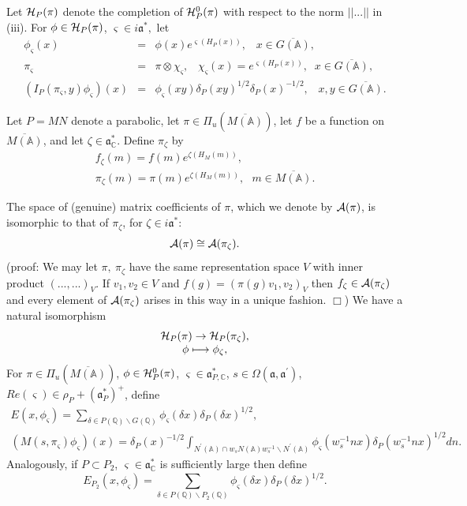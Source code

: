 Let ${\cal H}_P(\pi )$ denote the completion of ${\cal H}_P^0(\pi )$ with
respect to the norm $||...||$ in (iii). For
$\phi \in {\cal H}_P(\pi )$, $\varsigma \in i{\mathfrak{a}}^{*},$ let
\begin{eqnarray*}
\phi _\varsigma (x)
&=&\phi (x)e^{\varsigma (H_P(x))},\;\;\;x\in \overline{G({\mathbb{A}})},
\\
\pi _\varsigma  &=&\pi \otimes \chi _\varsigma ,\;\;\;\chi _\varsigma
(x)=e^{\varsigma (H_P(x))},\;\;x\in \overline{G({\mathbb{A}})}, \\
(I_P(\pi _\varsigma ,y)\phi _\varsigma )(x) &=&\phi _\varsigma (xy)\delta
_P(xy)^{1/2}\delta _P(x)^{-1/2},\;\;\;x,y\in \overline{G({\mathbb{A}})}.
\end{eqnarray*}

Let $P=MN$ denote a parabolic, let $\pi \in \Pi _u(\overline{M({\mathbb{A}})})$,
let $f$ be a function on $\overline{M({\mathbb{A}})}$,
and let $\zeta\in {\mathfrak{a}}^*_{\mathbb{C}}$. Define $\pi_\zeta$ by
\begin{equation}
\begin{array}{c}
f_\zeta (m)=f(m)e^{\zeta(H_M(m))},\\
\pi_\zeta(m)=\pi(m)e^{\zeta(H_M(m))},\ \ \ m\in \overline{M({\mathbb{A}})}.
\end{array}
\end{equation}

The space of (genuine) matrix coefficients of $\pi$, which we denote by
${\cal A}(\pi)$, is isomorphic to that of $\pi_\zeta$, for
$\zeta\in i{\mathfrak{a}}^*$:
$$
{\cal A}(\pi)\cong {\cal A}(\pi_\zeta).
$$
(proof: We may let $\pi,\ \pi_\zeta$ have the same representation space
$V$ with inner product $(...,...)_V$. If $v_1,v_2\in V$ and
$f(g)=(\pi(g)v_1,v_2)_V$ then $f_\zeta\in {\cal A}(\pi_\zeta)$ and every
element of ${\cal A}(\pi_\zeta)$ arises in this way in a unique
fashion. $\Box$) We have a natural isomorphism
$$
\begin{array}{c}
{\cal H}_P(\pi)\rightarrow {\cal H}_P(\pi_\zeta),\\
\phi\longmapsto \phi_\zeta,
\end{array}
$$
For $\pi \in \Pi _u(\overline{M({\mathbb{A}})})$,
$\phi \in {\cal H}_P^0(\pi )$,
$\varsigma \in {\mathfrak{a}}_{P,{\mathbb C}}^{*}$,
$s\in \Omega ({\mathfrak{a}},{\mathfrak{a}}^{\prime})$,
$Re(\varsigma )\in \rho _P+({\mathfrak{a}}_P^{*})^{+}$, define
\begin{equation}
\begin{array}{c}
E(x,\phi _\varsigma )
=\sum_{\delta \in P({\mathbb{Q}})\backslash G({\mathbb{Q}})}
\phi _\varsigma (\delta x)\delta _P(\delta x)^{1/2}, \\
(M(s,\pi _\varsigma )\phi _\varsigma )(x)
=\delta_P(x)^{-1/2}
\int_{N^{\prime }({\mathbb{A}})\cap w_sN({\mathbb{A}})w_s^{-1}\backslash
N^{\prime }({\mathbb{A}})}
\phi _\varsigma (w_s^{-1}nx)\delta_P(w_s^{-1}nx)^{1/2}dn.
\end{array}
\end{equation}
Analogously, if $P\subset P_2$, $\varsigma \in {\mathfrak{a}}_{{\mathbb C}}^{*}$ is
sufficiently large then define
\[
E_{P_2}(x,\phi _\varsigma )
=\sum_{\delta \in P({\mathbb{Q}})\backslash P_2({\mathbb{Q}})}
\phi _\varsigma (\delta x)\delta _P(\delta x)^{1/2}.
\]

